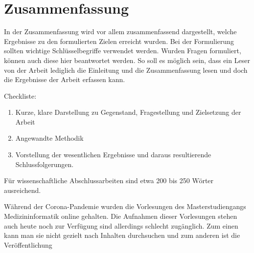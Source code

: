 \chapter*{Zusammenfassung}
In der Zusammenfassung wird vor allem zusammenfassend dargestellt, welche Ergebnisse zu den formulierten Zielen erreicht wurden.
Bei der Formulierung sollten wichtige Schlüsselbegriffe verwendet werden.
Wurden Fragen formuliert, können auch diese hier beantwortet werden.
So soll es möglich sein, dass ein Leser von der Arbeit lediglich die Einleitung und die Zusammenfassung lesen und doch die Ergebnisse der Arbeit erfassen kann.

Checkliste:
\begin{enumerate}
\item Kurze, klare Darstellung zu Gegenstand, Fragestellung und Zielsetzung der Arbeit
\item Angewandte Methodik
\item Vorstellung der wesentlichen Ergebnisse und daraus resultierende Schlussfolgerungen.
\end{enumerate}
Für wissenschaftliche Abschlussarbeiten sind etwa 200 bis 250 Wörter ausreichend.

Während der Corona-Pandemie wurden die Vorlesungen des Masterstudiengangs Medizininformatik online gehalten. Die Aufnahmen dieser Vorlesungen stehen auch heute noch zur Verfügung sind allerdings schlecht zugänglich. Zum einen kann man sie nicht gezielt nach Inhalten durchsuchen und zum anderen ist die Veröffentlichung 

\vfill